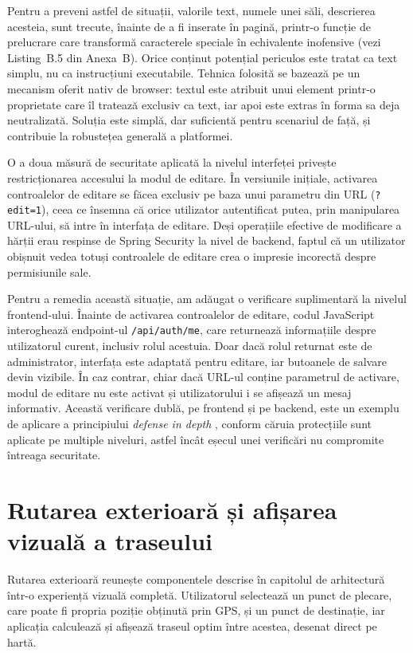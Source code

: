 Pentru a preveni astfel de situații, valorile text, numele unei săli,
descrierea acesteia, sunt trecute, înainte de a fi inserate în pagină,
printr-o funcție de prelucrare care transformă caracterele speciale în
echivalente inofensive (vezi Listing~B.5 din Anexa~B). Orice conținut
potențial periculos este tratat ca text simplu, nu ca instrucțiuni
executabile. Tehnica folosită se bazează pe un mecanism oferit nativ de
browser: textul este atribuit unui element printr-o proprietate care îl
tratează exclusiv ca text, iar apoi este extras în forma sa deja
neutralizată. Soluția este simplă, dar suficientă pentru scenariul de față,
și contribuie la robustețea generală a platformei.
 
O a doua măsură de securitate aplicată la nivelul interfeței privește
restricționarea accesului la modul de editare. În versiunile inițiale,
activarea controalelor de editare se făcea exclusiv pe baza unui parametru
din URL (\texttt{?edit=1}), ceea ce însemna că orice utilizator autentificat
putea, prin manipularea URL-ului, să intre în interfața de editare. Deși
operațiile efective de modificare a hărții erau respinse de Spring Security
la nivel de backend, faptul că un utilizator obișnuit vedea totuși controalele
de editare crea o impresie incorectă despre permisiunile sale.
 
Pentru a remedia această situație, am adăugat o verificare suplimentară la
nivelul frontend-ului. Înainte de activarea controalelor de editare, codul
JavaScript interoghează endpoint-ul \texttt{/api/auth/me}, care returnează
informațiile despre utilizatorul curent, inclusiv rolul acestuia. Doar dacă
rolul returnat este de administrator, interfața este adaptată pentru editare,
iar butoanele de salvare devin vizibile. În caz contrar, chiar dacă URL-ul
conține parametrul de activare, modul de editare nu este activat și
utilizatorului i se afișează un mesaj informativ. Această verificare dublă,
pe frontend și pe backend, este un exemplu de aplicare a principiului
\textit{defense in depth} \cite{NIST_DefenseInDepth}, conform căruia protecțiile sunt aplicate pe
multiple niveluri, astfel încât eșecul unei verificări nu compromite întreaga
securitate.

\section{Rutarea exterioară și afișarea vizuală a traseului}
\label{sec:rutare-exterior}

Rutarea exterioară reunește componentele descrise în capitolul de arhitectură
într-o experiență vizuală completă. Utilizatorul selectează un punct de
plecare, care poate fi propria poziție obținută prin GPS, și un punct de
destinație, iar aplicația calculează și afișează traseul optim între acestea,
desenat direct pe hartă.

